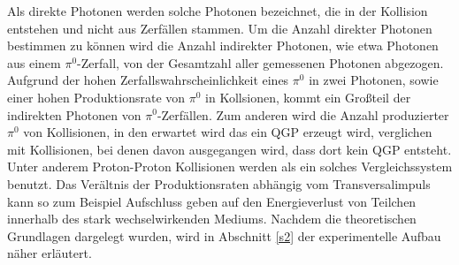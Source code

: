 Als direkte Photonen werden solche Photonen bezeichnet, die in der Kollision entstehen und nicht aus Zerf\"allen stammen.
Um die Anzahl direkter Photonen bestimmen zu k\"onnen wird die Anzahl indirekter Photonen, wie etwa Photonen aus einem $\pi^{0}$-Zerfall, von der Gesamtzahl aller gemessenen Photonen abgezogen.
Aufgrund der hohen Zerfallswahrscheinlichkeit eines $\pi^{0}$ in zwei Photonen, sowie einer hohen Produktionsrate von $\pi^{0}$ in Kollsionen, kommt ein Gro{\ss}teil der indirekten Photonen von $\pi^{0}$-Zerf\"allen.
\newline
Zum anderen wird die Anzahl produzierter $\pi^{0}$ von Kollisionen, in den erwartet wird das ein QGP erzeugt wird, verglichen mit Kollisionen, bei denen davon ausgegangen wird, dass dort kein QGP entsteht.
Unter anderem Proton-Proton Kollisionen werden als ein solches Vergleichssystem benutzt.
Das Ver\"altnis der Produktionsraten abh\"angig vom Transversalimpuls kann so zum Beispiel Aufschluss geben auf den Energieverlust von Teilchen innerhalb des stark wechselwirkenden Mediums.
\newline
Nachdem die theoretischen Grundlagen dargelegt wurden, wird in Abschnitt \ref{s2} der experimentelle Aufbau n\"aher erl\"autert.